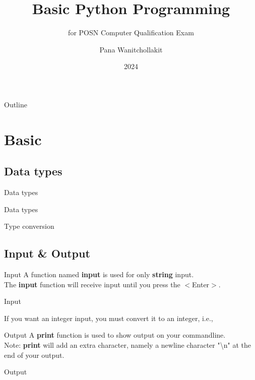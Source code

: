 \documentclass[aspectratio=43]{beamer}
\title[Basic Python]{Basic Python Programming}
\subtitle[POSN Computer]{for POSN Computer Qualification Exam}
\author[Pana W.]{Pana Wanitchollakit}
\date{2024}
\begin{document}
\frame{\titlepage}

\begin{frame}{Outline}
\end{frame}


\section{Basic}

\subsection[Data types]{Data types}
\begin{frame}{Data types}
    \begin{block}{Data types}
        
    \end{block}
    \begin{block}{Type conversion}
        
    \end{block}
\end{frame}


\subsection[I/O]{Input \& Output}
\begin{frame}{Input}
    A function named \textbf{input} is used for only \textbf{string} input. \\
    The \textbf{input} function will receive input until you press the $<$Enter$>$.
    \begin{block}{Input}
        
        If you want an integer input, you must convert it to an integer, i.e.,
        
    \end{block}
\end{frame}

\begin{frame}{Output}
    A \textbf{print} function is used to show output on your commandline. \\
    Note: \textbf{print} will add an extra character, namely a newline character "\textbackslash n" at the end of your output.
    \begin{block}{Output}
        
    \end{block}
\end{frame}
\end{document}

